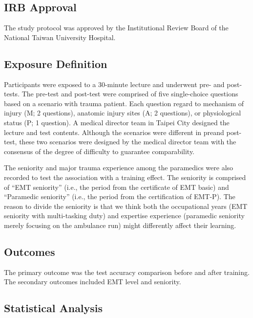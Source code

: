 \documentclass[
  20pt
]{article}
\begin{document}
\begin{multicols}{2}
{\subsection{IRB Approval}\label{irb-approval}}

The study protocol was approved by the Institutional Review Board of the
National Taiwan University Hospital.

\hypertarget{exposure-definition}{%
\subsection{Exposure Definition}\label{exposure-definition}}

Participants were exposed to a 30-minute lecture and underwent pre- and
post-tests. The pre-test and post-test were comprised of five
single-choice questions based on a scenario with trauma patient. Each
question regard to mechanism of injury (M; 2 questions), anatomic injury
sites (A; 2 questions), or physiological status (P; 1 question). A
medical director team in Taipei City designed the lecture and test
contents. Although the scenarios were different in preand post-test,
these two scenarios were designed by the medical director team with the
consensus of the degree of difficulty to guarantee comparability.

The seniority and major trauma experience among the paramedics were also
recorded to test the association with a training effect. The seniority
is comprised of ``EMT seniority'' (i.e., the period from the certificate
of EMT basic) and ``Paramedic seniority'' (i.e., the period from the
certification of EMT-P). The reason to divide the seniority is that we
think both the occupational years (EMT seniority with multi-tasking
duty) and expertise experience (paramedic seniority merely focusing on
the ambulance run) might differently affect their learning.

\hypertarget{outcomes}{%
\subsection{Outcomes}\label{outcomes}}

The primary outcome was the test accuracy comparison before and after
training. The secondary outcomes included EMT level and seniority.

\hypertarget{statistical-analysis}{%
\subsection{Statistical Analysis}\label{statistical-analysis}}


\end{multicols}
\end{document}
